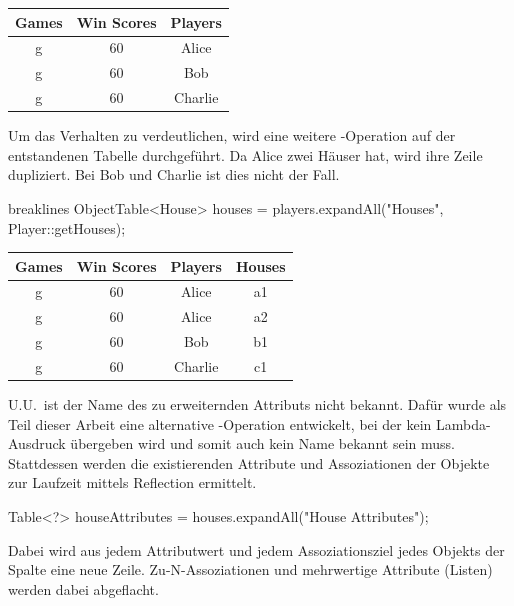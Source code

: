 \begin{tabular}{|c|c|c|}
    \hline
    \textbf{Games} & \textbf{Win Scores} & \textbf{Players} \\
    \hline
    g & 60 & Alice   \\
    g & 60 & Bob     \\
    g & 60 & Charlie \\
    \hline
\end{tabular}

Um das Verhalten zu verdeutlichen, wird eine weitere -Operation auf der entstandenen Tabelle durchgeführt.
Da Alice zwei Häuser hat, wird ihre Zeile dupliziert.
Bei Bob und Charlie ist dies nicht der Fall.

\begin{jcodeblock*}{breaklines}
    ObjectTable<House> houses = players.expandAll("Houses", Player::getHouses);
\end{jcodeblock*}

\begin{tabular}{|c|c|c|c|}
    \hline
    \textbf{Games} & \textbf{Win Scores} & \textbf{Players} & \textbf{Houses} \\
    \hline
    g & 60 & Alice   & a1 \\
    g & 60 & Alice   & a2 \\
    g & 60 & Bob     & b1 \\
    g & 60 & Charlie & c1 \\
    \hline
\end{tabular}

U.U.\ ist der Name des zu erweiternden Attributs nicht bekannt.
Dafür wurde als Teil dieser Arbeit eine alternative -Operation entwickelt,
bei der kein Lambda-Ausdruck übergeben wird und somit auch kein Name bekannt sein muss.
Stattdessen werden die existierenden Attribute und Assoziationen der Objekte zur Laufzeit mittels Reflection ermittelt.

\begin{jcodeblock}
    Table<?> houseAttributes = houses.expandAll("House Attributes");
\end{jcodeblock}

Dabei wird aus jedem Attributwert und jedem Assoziationsziel jedes Objekts der Spalte  eine neue Zeile.
Zu-N-Assoziationen und mehrwertige Attribute (Listen) werden dabei abgeflacht.

